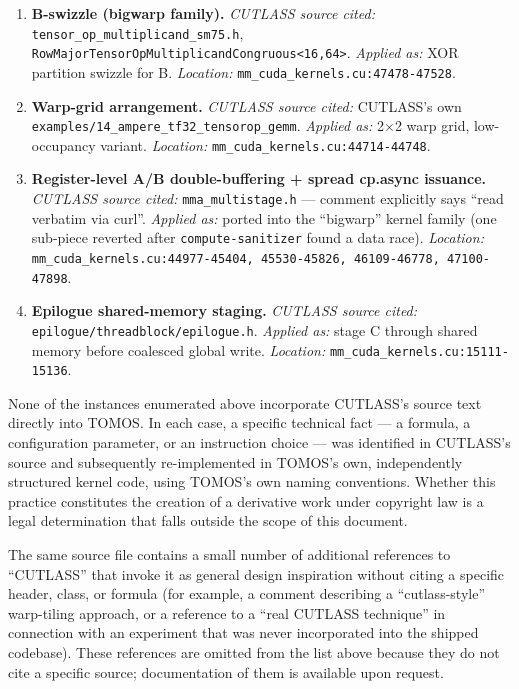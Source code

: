 \documentclass[11pt]{article}
\begin{document}
\begin{enumerate}[leftmargin=*]
\item \textbf{B-swizzle (bigwarp family).}
\textit{CUTLASS source cited:} \texttt{tensor\_op\_multiplicand\_sm75.h},
\texttt{RowMajorTensorOpMultiplicandCongruous<16,64>}.
\textit{Applied as:} XOR partition swizzle for B.
\textit{Location:} \texttt{mm\_cuda\_kernels.cu:47478-47528}.

\item \textbf{Warp-grid arrangement.}
\textit{CUTLASS source cited:} CUTLASS's own
\texttt{examples/14\_ampere\_tf32\_tensorop\_gemm}.
\textit{Applied as:} 2$\times$2 warp grid, low-occupancy variant.
\textit{Location:} \texttt{mm\_cuda\_kernels.cu:44714-44748}.

\item \textbf{Register-level A/B double-buffering + spread cp.async
issuance.}
\textit{CUTLASS source cited:} \texttt{mma\_multistage.h} --- comment
explicitly says ``read verbatim via curl''.
\textit{Applied as:} ported into the ``bigwarp'' kernel family (one
sub-piece reverted after \texttt{compute-sanitizer} found a data race).
\textit{Location:} \texttt{mm\_cuda\_kernels.cu:44977-45404, 45530-45826,
46109-46778, 47100-47898}.

\item \textbf{Epilogue shared-memory staging.}
\textit{CUTLASS source cited:}
\texttt{epilogue/threadblock/epilogue.h}.
\textit{Applied as:} stage C through shared memory before coalesced global
write.
\textit{Location:} \texttt{mm\_cuda\_kernels.cu:15111-15136}.

\end{enumerate}

None of the instances enumerated above incorporate CUTLASS's source text
directly into TOMOS. In each case, a specific technical fact --- a formula,
a configuration parameter, or an instruction choice --- was identified in
CUTLASS's source and subsequently re-implemented in TOMOS's own,
independently structured kernel code, using TOMOS's own naming
conventions. Whether this practice constitutes the creation of a
derivative work under copyright law is a legal determination that falls
outside the scope of this document.

The same source file contains a small number of additional references to
``CUTLASS'' that invoke it as general design inspiration without citing a
specific header, class, or formula (for example, a comment describing a
``cutlass-style'' warp-tiling approach, or a reference to a ``real CUTLASS
technique'' in connection with an experiment that was never incorporated
into the shipped codebase). These references are omitted from the list
above because they do not cite a specific source; documentation of them is
available upon request.
\end{document}
